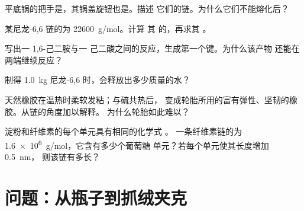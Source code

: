 \begin{exercise}[$\star\star$]\label{exo:g12:polymers:10}
平底锅的把手是，其锅盖旋钮也是。描述
它们的链。为什么它们不能熔化后？
\end{exercise}

\begin{exercise}[$\star\star$]\label{exo:g12:polymers:11}
某尼龙-6,6 链的为 \qty{22600}{g/mol}。计算
其  的，再求其
。
\end{exercise}

\begin{exercise}[$\star\star\star$]\label{exo:g12:polymers:12}
写出一 1,6-己二胺与一
己二酸之间的反应，生成第一个键。为什么该产物
还能在两端继续反应？
\end{exercise}

\begin{exercise}[$\star\star\star$]\label{exo:g12:polymers:13}
制得 \qty{1.0}{kg} 尼龙-6,6 时，会释放出多少质量的水？
\end{exercise}

\begin{exercise}[$\star\star\star$]\label{exo:g12:polymers:14}
天然橡胶在温热时柔软发粘；与硫共热后，
变成轮胎所用的富有弹性、坚韧的橡胶。从链的角度加以解释。
为什么轮胎如此难以？
\end{exercise}

\begin{exercise}[$\star\star\star$]\label{exo:g12:polymers:15}
淀粉和纤维素的每个单元具有相同的化学式 。
一条纤维素链的为 \qty{1.6e6}{g/mol}，它含有多少个葡萄糖
单元？若每个单元使其长度增加 \qty{0.5}{nm}，
则该链有多长？
\end{exercise}

\section{问题：从瓶子到抓绒夹克}

